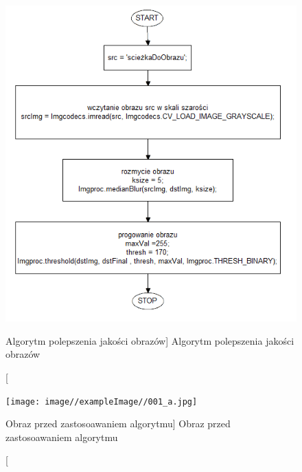 \documentclass[a4paper,12pt]{article}
\begin{document}
			    \newpage
    		    
    		    \begin{figure}[!ht]  
    			    \begin{center}
    			        \includegraphics[]{image//algorithm//improveImg.png}%
    			    \end{center}
    			    \caption
        			    [Algorytm polepszenia jakości obrazów]  
	    		        {Algorytm polepszenia jakości obrazów} 
	    		        \label{fig:betterImg}
    		    \end{figure}
		
                \newpage
		
    		    \begin{figure}[!ht]  
    			    \begin{center}
    				    \texttt{[image: image//exampleImage//001\_a.jpg]} 
    			    \end{center}
    			    \caption
        			    [Obraz przed zastosoawaniem algorytmu]  
                        {Obraz przed zastosoawaniem algorytmu}  
    		    \end{figure}
		
\end{document}
